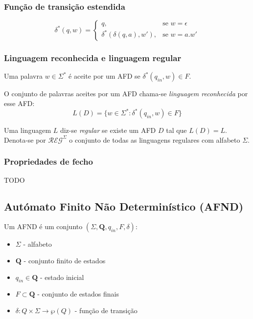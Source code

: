 \documentclass{article}
\begin{document}
\subsubsection{Função de transição estendida}

$$\delta^*(q,w) = \begin{cases}
        q,                        & \text{se } w = \epsilon \\
        \delta^*(\delta(q,a),w'), & \text{se } w = a.w'
    \end{cases}$$

\subsubsection{Linguagem reconhecida e linguagem regular}

Uma palavra $w \in \Sigma^*$ é aceite por um AFD se $\delta^*(q_{in}, w) \in F$.

\noindent O conjunto de palavras aceites por um AFD chama-se \emph{linguagem reconhecida} por esse AFD:
$$L(D) = \{w \in \Sigma^* : \delta^*(q_{in}, w) \in F \}$$

\noindent Uma linguagem $L$ diz-se \emph{regular} se existe um AFD $D$ tal que $L(D) = L$. Denota-se por $\mathcal{REG}^\Sigma$ o conjunto de todas as linguagens regulares com alfabeto $\Sigma$.

\subsubsection{Propriedades de fecho}

TODO

\subsection{Autómato Finito Não Determinístico (AFND)}

Um AFND é um conjunto $(\Sigma, \mathbf{Q}, q_{in}, F, \delta)$:

\begin{itemize}
    \item $\Sigma$ - alfabeto
    \item $\mathbf{Q}$ - conjunto finito de estados
    \item $q_{in} \in \mathbf{Q}$ - estado inicial
    \item $F \subset \mathbf{Q}$ - conjunto de estados finais
    \item $\delta : Q \times \Sigma \to \wp(Q)$ - função de transição
\end{itemize}
\end{document}
